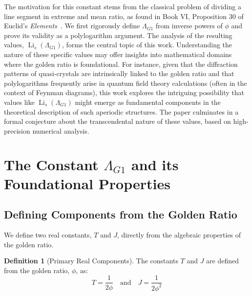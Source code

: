 \documentclass{amsart}
\theoremstyle{plain}
\theoremstyle{definition}
\newtheorem{definition}[theorem]{Definition}
\theoremstyle{remark}
\DeclareMathOperator{\Li}{Li} %
\newcommand{\LambdaG}{\Lambda_{G1}}
\newcommand{\phiG}{\phi}
\begin{document}
The motivation for this constant stems from the classical problem of dividing a line segment in extreme and mean ratio, as found in Book VI, Proposition 30 of Euclid's \textit{Elements}~\cite{Euclid}. We first rigorously define $\LambdaG$ from inverse powers of $\phiG$ and prove its validity as a polylogarithm argument. The analysis of the resulting values, $\Li_s(\LambdaG)$, forms the central topic of this work. Understanding the nature of these specific values may offer insights into mathematical domains where the golden ratio is foundational. For instance, given that the diffraction patterns of quasi-crystals are intrinsically linked to the golden ratio and that polylogarithms frequently arise in quantum field theory calculations (often in the context of Feynman diagrams), this work explores the intriguing possibility that values like $\Li_s(\LambdaG)$ might emerge as fundamental components in the theoretical description of such aperiodic structures. The paper culminates in a formal conjecture about the transcendental nature of these values, based on high-precision numerical analysis.

\section{The Constant \texorpdfstring{$\LambdaG$}{Lambda\_G1} and its Foundational Properties}

\subsection{Defining Components from the Golden Ratio}
We define two real constants, $T$ and $J$, directly from the algebraic properties of the golden ratio.
\begin{definition}[Primary Real Components]
The constants $T$ and $J$ are defined from the golden ratio, $\phiG$, as:
\[ T = \frac{1}{2\phiG} \quad \text{and} \quad J = \frac{1}{2\phiG^2} \]
\end{definition}
\end{document}
